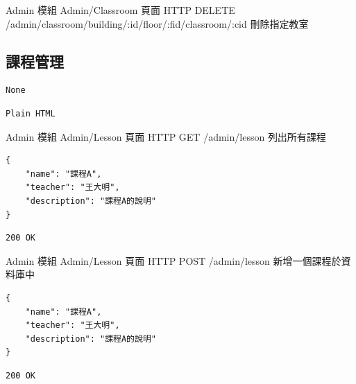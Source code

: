 \documentclass{article}
\begin{document}
{Admin 模組}
{Admin/Classroom 頁面}
{HTTP DELETE}
{/admin/classroom/building/:id/floor/:fid/classroom/:cid}
{刪除指定教室}

\pagebreak

\subsection{課程管理}

\begin{lrbox}{\jsoninputbox}
	\begin{lstlisting}
None
\end{lstlisting}
\end{lrbox}

\begin{lrbox}{\jsonoutputbox}
	\begin{lstlisting}
Plain HTML
\end{lstlisting}
\end{lrbox}

{Admin 模組}
{Admin/Lesson 頁面}
{HTTP GET}
{/admin/lesson}
{列出所有課程}

\bigskip

\begin{lrbox}{\jsoninputbox}
	\begin{lstlisting}[basicstyle=\tiny\ttfamily]
{
	"name": "課程A",
	"teacher": "王大明",
	"description": "課程A的說明"
}
\end{lstlisting}
\end{lrbox}

\begin{lrbox}{\jsonoutputbox}
	\begin{lstlisting}
200 OK
\end{lstlisting}
\end{lrbox}

{Admin 模組}
{Admin/Lesson 頁面}
{HTTP POST}
{/admin/lesson}
{新增一個課程於資料庫中}

\bigskip

\begin{lrbox}{\jsoninputbox}
	\begin{lstlisting}[basicstyle=\tiny\ttfamily]
{
	"name": "課程A",
	"teacher": "王大明",
	"description": "課程A的說明"
}
\end{lstlisting}
\end{lrbox}

\begin{lrbox}{\jsonoutputbox}
	\begin{lstlisting}
200 OK
\end{lstlisting}
\end{lrbox}
\end{document}
